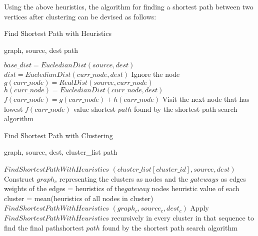 Using the above heuristics, the algorithm for finding a shortest
path between two vertices after clustering can be devised as follows:

\begin{algorithm}[H]
    \label{alg:shortest_path_with_heuristics}
    \caption{Find Shortest Path with Heuristics}
    \begin{algorithmic}[1]
    \renewcommand{\algorithmicrequire}{\textbf{Input:}}
    \renewcommand{\algorithmicensure}{\textbf{Output:}}
    \REQUIRE graph, source, dest
    \ENSURE  path

    \STATE $base\_dist = EucledianDist(source, dest)$
    \STATE $dist = EucledianDist(curr\_node, dest)$
    \STATE Ignore the node
    \ENDIF
    \STATE $g(curr\_node) = RealDist(source, curr\_node)$
    \STATE $h(curr\_node) = EucledianDist(curr\_node, dest)$
    \STATE $f(curr\_node) = g(curr\_node) + h(curr\_node)$
    \STATE Visit the next node that has lowest $f(curr\_node)$ value
    \RETURN shortest $path$ found by the shortest path search algorithm
    \end{algorithmic}
\end{algorithm}
\begin{algorithm}[H]
    \label{alg:shortest_path_with_clustering}
    \caption{Find Shortest Path with Clustering}
    \begin{algorithmic}[1]
    \renewcommand{\algorithmicrequire}{\textbf{Input:}}
    \renewcommand{\algorithmicensure}{\textbf{Output:}}
    \REQUIRE graph, source, dest, cluster\_list
    \ENSURE  path

    \STATE $Find Shortest Path With Heuristics$
    \STATE $(cluster\_list[cluster\_id], source, dest)$
    \ELSE
    \STATE Construct $graph_c$ representing the clusters as nodes and the $gateways$ as edges
    \STATE weights of the edges = heuristics of the ​$gateway$ nodes​
    \STATE heuristic value of each cluster = mean(heuristics of all nodes in cluster)​
    \STATE $Find Shortest Path With Heuristics$
    \STATE $(graph_c, source_c, dest_c)$
    \STATE Apply ​$Find Shortest Path With Heuristics$ recursively in every cluster in that sequence to find the final path​
    \ENDIF
    \RETURN shortest $path$ found by the shortest path search algorithm
    \end{algorithmic}
\end{algorithm}
